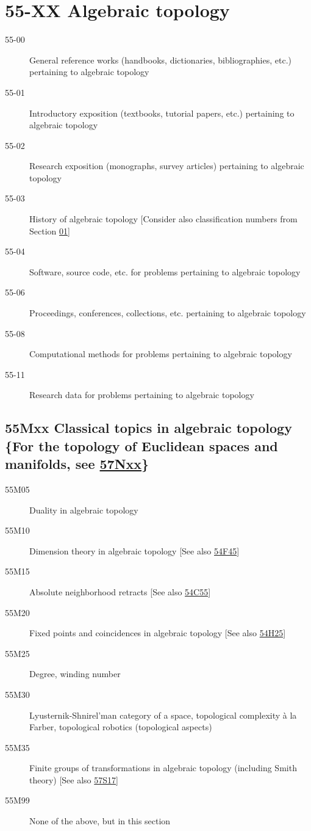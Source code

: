 \documentclass[letterpaper]{article}
\begin{document}
\section*{55-XX Algebraic topology }\label{55-XX}
\begin{description}
\item [55-00]\label{55-00} General reference works (handbooks, dictionaries, bibliographies, etc.) pertaining to algebraic topology
\item [55-01]\label{55-01} Introductory exposition (textbooks, tutorial papers, etc.) pertaining to algebraic topology
\item [55-02]\label{55-02} Research exposition (monographs, survey articles) pertaining to algebraic topology
\item [55-03]\label{55-03} History of algebraic topology [Consider also classification numbers from Section \hyperref[01-XX]{01}]
\item [55-04]\label{55-04} Software, source code, etc. for problems pertaining to algebraic topology
\item [55-06]\label{55-06} Proceedings, conferences, collections, etc. pertaining to algebraic topology
\item [55-08]\label{55-08} Computational methods for problems pertaining to algebraic topology
\item [55-11]\label{55-11} Research data for problems pertaining to algebraic topology
\end{description}
\subsection*{55Mxx  Classical topics in algebraic topology \{For the topology of Euclidean spaces and manifolds, see \hyperref[57Nxx]{57Nxx}\} }\label{55Mxx}
\begin{description}  
\item [55M05]\label{55M05} Duality in algebraic topology
\item [55M10]\label{55M10} Dimension theory in algebraic topology [See also \hyperref[54F45]{54F45}]
\item [55M15]\label{55M15} Absolute neighborhood retracts [See also \hyperref[54C55]{54C55}]
\item [55M20]\label{55M20} Fixed points and coincidences in algebraic topology [See also \hyperref[54H25]{54H25}]
\item [55M25]\label{55M25} Degree, winding number
\item [55M30]\label{55M30} Lyusternik-Shnirel'man category of a space, topological complexity \`a la Farber, topological robotics (topological aspects)
\item [55M35]\label{55M35} Finite groups of transformations in algebraic topology (including Smith theory) [See also \hyperref[57S17]{57S17}]
\item [55M99]\label{55M99} None of the above, but in this section
\end{description}
\end{document}
